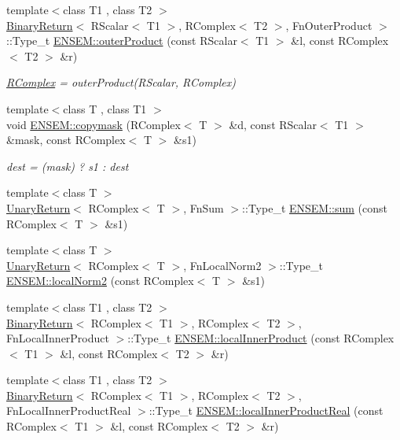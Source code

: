 \begin{DoxyCompactItemize}
{\footnotesize template$<$class T1 , class T2 $>$ }\\\mbox{\hyperlink{structBinaryReturn}{Binary\+Return}}$<$ R\+Scalar$<$ T1 $>$, R\+Complex$<$ T2 $>$, Fn\+Outer\+Product $>$\+::Type\+\_\+t \mbox{\hyperlink{group__rcomplex_ga5f17e33943ff2fbe7237c0aa4182d06c}{E\+N\+S\+E\+M\+::outer\+Product}} (const R\+Scalar$<$ T1 $>$ \&l, const R\+Complex$<$ T2 $>$ \&r)
\begin{DoxyCompactList}\small\item\em \mbox{\hyperlink{classENSEM_1_1RComplex}{R\+Complex}} = outer\+Product(\+R\+Scalar, R\+Complex) \end{DoxyCompactList}\item 
{\footnotesize template$<$class T , class T1 $>$ }\\void \mbox{\hyperlink{group__rcomplex_ga8228a6185ea266e1e7d4c221c76bd5f1}{E\+N\+S\+E\+M\+::copymask}} (R\+Complex$<$ T $>$ \&d, const R\+Scalar$<$ T1 $>$ \&mask, const R\+Complex$<$ T $>$ \&s1)
\begin{DoxyCompactList}\small\item\em dest = (mask) ? s1 \+: dest \end{DoxyCompactList}\item 
{\footnotesize template$<$class T $>$ }\\\mbox{\hyperlink{structUnaryReturn}{Unary\+Return}}$<$ R\+Complex$<$ T $>$, Fn\+Sum $>$\+::Type\+\_\+t \mbox{\hyperlink{group__rcomplex_ga402ccaab21c1a8ce0e99c8d2b1ee1c53}{E\+N\+S\+E\+M\+::sum}} (const R\+Complex$<$ T $>$ \&s1)
\item 
{\footnotesize template$<$class T $>$ }\\\mbox{\hyperlink{structUnaryReturn}{Unary\+Return}}$<$ R\+Complex$<$ T $>$, Fn\+Local\+Norm2 $>$\+::Type\+\_\+t \mbox{\hyperlink{group__rcomplex_gaeb6b484f4bb6decc4552e2c635452b3f}{E\+N\+S\+E\+M\+::local\+Norm2}} (const R\+Complex$<$ T $>$ \&s1)
\item 
{\footnotesize template$<$class T1 , class T2 $>$ }\\\mbox{\hyperlink{structBinaryReturn}{Binary\+Return}}$<$ R\+Complex$<$ T1 $>$, R\+Complex$<$ T2 $>$, Fn\+Local\+Inner\+Product $>$\+::Type\+\_\+t \mbox{\hyperlink{group__rcomplex_ga4ccc8c0a3c54b7eb19e0d5aa1c6ac89d}{E\+N\+S\+E\+M\+::local\+Inner\+Product}} (const R\+Complex$<$ T1 $>$ \&l, const R\+Complex$<$ T2 $>$ \&r)
\item 
{\footnotesize template$<$class T1 , class T2 $>$ }\\\mbox{\hyperlink{structBinaryReturn}{Binary\+Return}}$<$ R\+Complex$<$ T1 $>$, R\+Complex$<$ T2 $>$, Fn\+Local\+Inner\+Product\+Real $>$\+::Type\+\_\+t \mbox{\hyperlink{group__rcomplex_ga1480abb301211dfb7c0071739fce6a6a}{E\+N\+S\+E\+M\+::local\+Inner\+Product\+Real}} (const R\+Complex$<$ T1 $>$ \&l, const R\+Complex$<$ T2 $>$ \&r)

\end{DoxyCompactItemize}
